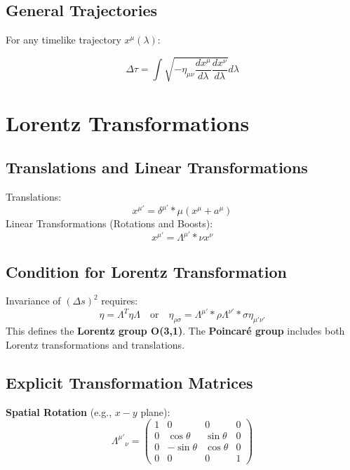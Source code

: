 \documentclass[11pt, a4paper]{report}
\begin{document}
\subsection*{General Trajectories}
For any timelike trajectory $x^\mu(\lambda)$:

$$\Delta \tau = \int \sqrt{ -\eta_{\mu\nu} \frac{dx^\mu}{d\lambda} \frac{dx^\nu}{d\lambda} } d\lambda$$

\section{Lorentz Transformations}
\subsection*{Translations and Linear Transformations}
Translations:
\begin{equation}\label{eq:translation}
x^{\mu'} = \delta^{\mu'}*\mu (x^\mu + a^\mu)
\end{equation}
Linear Transformations (Rotations and Boosts):
\begin{equation}\label{eq:linear-transform}
x^{\mu'} = \Lambda^{\mu'}*\nu x^\nu
\end{equation}

\subsection*{Condition for Lorentz Transformation}
Invariance of $(\Delta s)^2$ requires:
\begin{equation}\label{eq:lorentz-condition}
\eta = \Lambda^T \eta \Lambda \quad \text{or} \quad \eta_{\rho\sigma} = \Lambda^{\mu'}*\rho \Lambda^{\nu'}*\sigma \eta_{\mu'\nu'}
\end{equation}
This defines the \textbf{Lorentz group O(3,1)}. The \textbf{Poincaré group} includes both Lorentz transformations and translations.

\subsection*{Explicit Transformation Matrices}
\textbf{Spatial Rotation} (e.g., $x-y$ plane):
\begin{equation}\label{eq:rotation-matrix}
{\Lambda^{\mu'}}_{\nu} =
\begin{pmatrix}
1 & 0 & 0 & 0 \\
0 & \cos\theta & \sin\theta & 0 \\
0 & -\sin\theta & \cos\theta & 0 \\
0 & 0 & 0 & 1
\end{pmatrix}
\end{equation}
\end{document}
